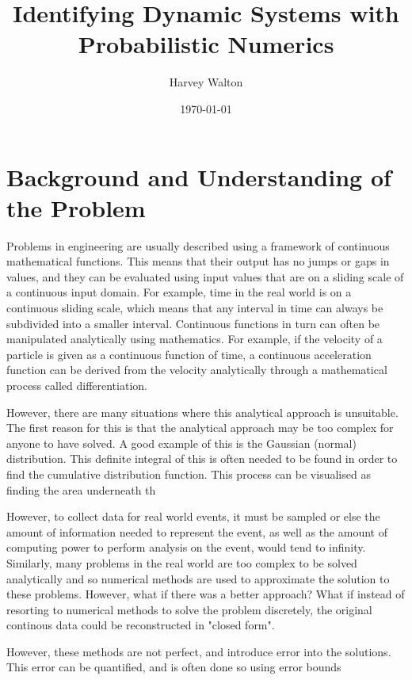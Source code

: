 \documentclass[12pt]{article}
\title{Identifying Dynamic Systems with Probabilistic Numerics}
\author{Harvey Walton}
\date{\today}
\begin{document}

    \thispagestyle{empty}
    


    \tableofcontents
    \newpage


    \section{Background and Understanding of the Problem}


    Problems in engineering are usually described using a framework of continuous mathematical functions.
    This means that their output has no jumps or gaps in values, and they can be evaluated using input values that are on a sliding scale of a continuous input domain.
    For example, time in the real world is on a continuous sliding scale, which means that any interval in time can always be subdivided into a smaller interval.
    Continuous functions in turn can often be manipulated analytically using mathematics.
    For example, if the velocity of a particle is given as a continuous function of time, a continuous acceleration function can be derived from the velocity analytically through a mathematical process called differentiation.

    However, there are many situations where this analytical approach is unsuitable.
    The first reason for this is that the analytical approach may be too complex for anyone to have solved.
    A good example of this is the Gaussian (normal) distribution.
    This definite integral of this is often needed to be found in order to find the cumulative distribution function.
    This process can be visualised as finding the area underneath th


    However, to collect data for real world events, it must be sampled or else the amount of information needed to represent the event, as well as the amount of computing power to perform analysis on the event, would tend to infinity.
    Similarly, many problems in the real world are too complex to be solved analytically and so numerical methods are used to approximate the solution to these problems.
    However, what if there was a better approach?
    What if instead of resorting to numerical methods to solve the problem discretely, the original continous data could be reconstructed in "closed form".

        However, these methods are not perfect, and introduce error into the solutions.
        This error can be quantified, and is often done so using error bounds
\end{document}
